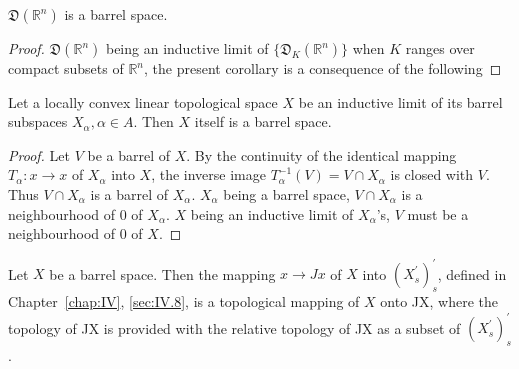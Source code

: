 \begin{corollary}\label{cor:AV.2.Corollary.3} $\mathfrak{D}(\mathbb{R}^{n})$ is a barrel space. 
\end{corollary}

\begin{proof}
 $\mathfrak{D}(\mathbb{R}^{n})$ being an inductive limit of $\{\mathfrak{D}_K(\mathbb{R}^{n})\}$ when $K$ ranges over compact subsets of $\mathbb{R}^{n}$, the present corollary is a consequence of the following 
\end{proof}

\begin{propositionu} Let a locally convex linear topological space $X$ be an inductive limit of its barrel subspaces $X_{\alpha}, \alpha \in A$. Then $X$ itself is a barrel space. 
\end{propositionu}

\begin{proof}
 Let $V$ be a barrel of $X$. By the continuity of the identical mapping $T_{\alpha}: x \to x$ of $X_{\alpha}$ into $X$, the inverse image $T_{\alpha}^{-1}(V) = V \cap X_{\alpha}$ is closed with $V$. Thus $V \cap X_{\alpha}$ is a barrel of $X_{\alpha}$. $X_{\alpha}$ being a barrel space, $V \cap X_{\alpha}$ is a neighbourhood of $0$ of $X_{\alpha}$. $X$ being an inductive limit of $X_{\alpha}$'s, $V$ must be a neighbourhood of $0$ of $X$. 
\end{proof}

\begin{theorem}\label{thm:AV.2.Theorem.2} Let $X$ be a barrel space. Then the mapping $x \to Jx$ of $X$ into $(X_{s}^{\prime})_{s}^{\prime}$, defined in Chapter~\ref{chap:IV}, \ref{sec:IV.8}, is a topological mapping of $X$ onto JX, where the topology of JX is provided with the relative topology of JX as a subset of $(X_{s}^{\prime})_{s}^{\prime}$. 
\end{theorem}

